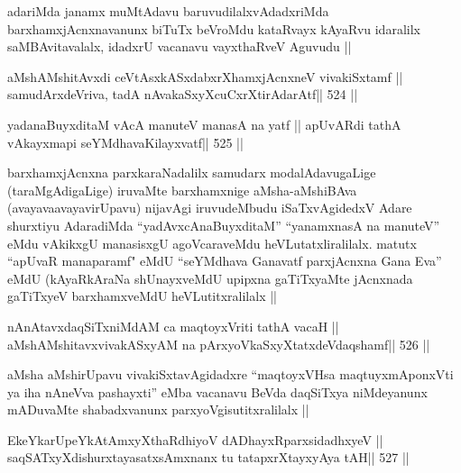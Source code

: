 \begin{artha}
adariMda janamx muMtAdavu baruvudilalxvAdadxriMda
barxhamxjAcnxnavanunx biTuTx beVroMdu kataRvayx kAyaRvu idaralilx
saMBAvitavalalx, idadxrU vacanavu vayxthaRveV Aguvudu ||
\end{artha}




\begin{shl}
aMshAMshitAvxdi ceVtAsxkASxdabxrXhamxjAcnxneV vivakiSxtamf ||
samudArxdeVriva, tadA nAvakaSxyXcuCxrXtirAdarAtf\hfill || 524 ||
\end{shl}

\begin{shl}
yadanaBuyxditaM vAcA manuteV manasA na yatf ||
apUvARdi tathA vAkayxmapi seYMdhavaKilayxvatf\hfill || 525 ||
\end{shl}

\begin{artha}
barxhamxjAcnxna parxkaraNadalilx samudarx modalAdavugaLige
(taraMgAdigaLige) iruvaMte barxhamxnige aMsha-aMshiBAva 
(avayavaavayavirUpavu) nijavAgi iruvudeMbudu iSaTxvAgidedxV Adare shurxtiyu
AdaradiMda ``yadAvxcAnaBuyxditaM'' ``yanamxnasA na manuteV'' eMdu
vAkikxgU manasisxgU agoVcaraveMdu heVLutatxliralilalx. matutx ``apUvaR
manaparamf" eMdU ``seYMdhava Ganavatf parxjAcnxna Gana Eva'' eMdU
(kAyaRkAraNa shUnayxveMdU upipxna gaTiTxyaMte jAcnxnada gaTiTxyeV
barxhamxveMdU heVLutitxralilalx || 
\end{artha}


\begin{shl}
nAnAtavxdaqSiTxniMdAM ca maqtoyxVriti tathA vacaH ||
aMshAMshitavxvivakASxyAM na pArxyoVkaSxyXtatxdeVdaqshamf\hfill || 526 ||
\end{shl}

\begin{artha}
aMsha aMshirUpavu vivakiSxtavAgidadxre ``maqtoyxVHsa maqtuyxmAponxVti
ya iha nAneVva pashayxti'' eMba vacanavu BeVda daqSiTxya niMdeyanunx
mADuvaMte shabadxvanunx parxyoVgisutitxralilalx ||
\end{artha}



\begin{shl}
EkeYkarUpeYkAtAmxyXthaRdhiyoV dADhayxRparxsidadhxyeV ||
saqSATxyXdishurxtayasatxsAmxnanx tu tatapxrXtayxyAya tAH\hfill || 527 ||
\end{shl}

